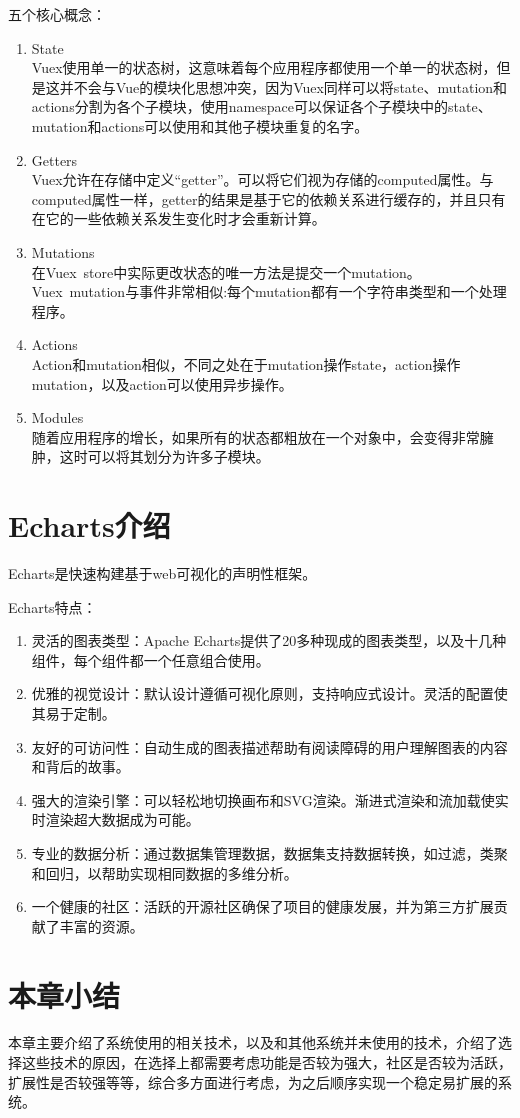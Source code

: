 五个核心概念：

\begin{enumerate}
  \item State\\
        Vuex使用单一的状态树，这意味着每个应用程序都使用一个单一的状态树，但是这并不会与Vue的模块化思想冲突，因为Vuex同样可以将state、mutation和actions分割为各个子模块，使用namespace可以保证各个子模块中的state、mutation和actions可以使用和其他子模块重复的名字。
  \item Getters\\
        Vuex允许在存储中定义“getter”。可以将它们视为存储的computed属性。与computed属性一样，getter的结果是基于它的依赖关系进行缓存的，并且只有在它的一些依赖关系发生变化时才会重新计算。
  \item Mutations\\
        在Vuex~store中实际更改状态的唯一方法是提交一个mutation。Vuex~mutation与事件非常相似:每个mutation都有一个字符串类型和一个处理程序。
  \item Actions\\
        Action和mutation相似，不同之处在于mutation操作state，action操作mutation，以及action可以使用异步操作。
  \item Modules\\
        随着应用程序的增长，如果所有的状态都粗放在一个对象中，会变得非常臃肿，这时可以将其划分为许多子模块。
\end{enumerate}

\section{Echarts介绍}

Echarts是快速构建基于web可视化的声明性框架。

Echarts特点：
\begin{enumerate}
  \item 灵活的图表类型：Apache Echarts提供了20多种现成的图表类型，以及十几种组件，每个组件都一个任意组合使用。
  \item 优雅的视觉设计：默认设计遵循可视化原则，支持响应式设计。灵活的配置使其易于定制。
  \item 友好的可访问性：自动生成的图表描述帮助有阅读障碍的用户理解图表的内容和背后的故事。
  \item 强大的渲染引擎：可以轻松地切换画布和SVG渲染。渐进式渲染和流加载使实时渲染超大数据成为可能。
  \item 专业的数据分析：通过数据集管理数据，数据集支持数据转换，如过滤，类聚和回归，以帮助实现相同数据的多维分析。
  \item 一个健康的社区：活跃的开源社区确保了项目的健康发展，并为第三方扩展贡献了丰富的资源。
\end{enumerate}

\section{本章小结}

本章主要介绍了系统使用的相关技术，以及和其他系统并未使用的技术，介绍了选择这些技术的原因，在选择上都需要考虑功能是否较为强大，社区是否较为活跃，扩展性是否较强等等，综合多方面进行考虑，为之后顺序实现一个稳定易扩展的系统。